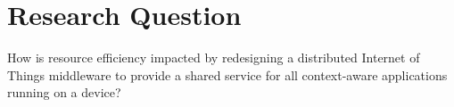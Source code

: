 \section{Research Question}
How is resource efficiency impacted by redesigning a distributed Internet of Things middleware to provide a shared service for all context-aware applications running on a device?